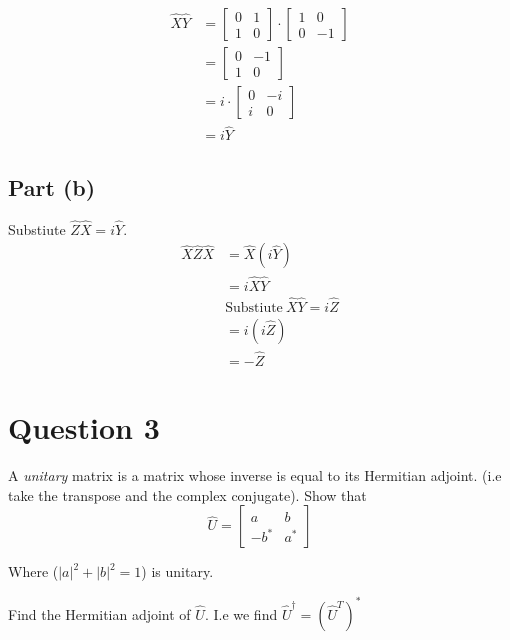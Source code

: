 \documentclass[12pt,a4paper]{article}
\begin{document}
			\begin{align*}
				\hat{X}\hat{Y} &= \begin{bmatrix} 0 & 1 \\ 1 & 0\end{bmatrix}\cdot \begin{bmatrix}1 & 0 \\ 0 & -1\end{bmatrix} \\
				&= \begin{bmatrix} 0 & -1 \\ 1 & 0\end{bmatrix} \\
				&= i\cdot \begin{bmatrix} 0 & -i \\ i & 0\end{bmatrix} \\
				&= i\hat{Y}
			\end{align*}

		\subsection{Part (b)}
			Substiute $\hat{Z}\hat{X} = i\hat{Y}$.
			\begin{align*}
				\hat{X}\hat{Z}\hat{X} &= \hat{X}(i\hat{Y}) \\
				&= i\hat{X}\hat{Y} \\
				&\text{Substiute} \ \hat{X}\hat{Y} = i\hat{Z} \\
				&= i(i\hat{Z}) \\
				&= -\hat{Z}
			\end{align*}
	
    \section{Question 3}
		\begin{mdframed}
			A \textit{unitary} matrix is a matrix whose inverse is equal to its Hermitian adjoint. (i.e take the transpose and the complex conjugate). Show that 
			\begin{equation*}
				\hat{U} = \begin{bmatrix} a & b \\ -b^* & a^* \end{bmatrix}
			\end{equation*}

			Where ($|a|^2 + |b|^2 = 1$) is unitary.
		\end{mdframed}

		Find the Hermitian adjoint of $\hat{U}$. I.e we find $\hat{U}^{\dagger} = (\hat{U}^T)^*$
		
\end{document}

